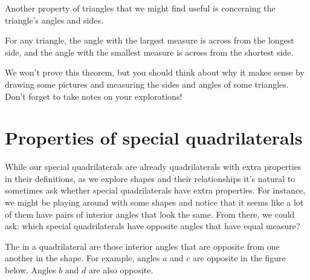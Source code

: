 \documentclass{ximera}
\begin{document}
Another property of triangles that we might find useful is concerning the triangle's angles and sides.
\begin{theorem}
For any triangle, the angle with the largest measure is across from the longest side, and the angle with the smallest measure is across from the shortest side.
\end{theorem}
We won't prove this theorem, but you should think about why it makes sense by drawing some pictures and measuring the sides and angles of some triangles. Don't forget to take notes on your explorations!


\section{Properties of special quadrilaterals}

While our special quadrilaterals are already quadrilaterals with extra properties in their definitions, as we explore shapes and their relationships it's natural to sometimes ask whether special quadrilaterals have extra properties. For instance, we might be playing around with some shapes and notice that it seems like a lot of them have pairs of interior angles that look the same. From there, we could ask: which special quadrilaterals have opposite angles that have equal measure?
\begin{definition}
The  in a quadrilateral are those interior angles that are opposite from one another in the shape. For example, angles $a$ and $c$ are opposite in the figure below. Angles $b$ and $d$ are also opposite.
\begin{image}
\end{image}
\end{definition}
\end{document}

